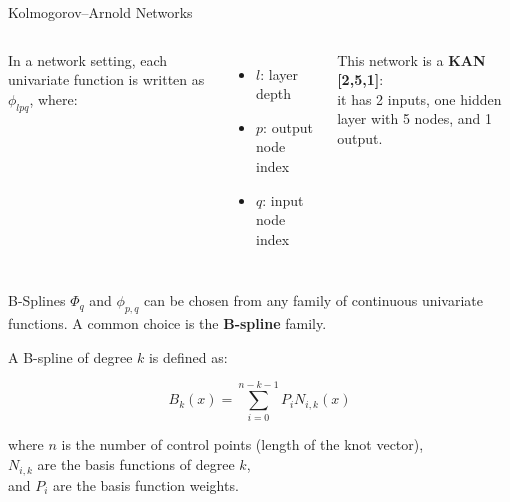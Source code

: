 \documentclass[aspectratio=169]{beamer}
\begin{document}
\begin{frame}{Kolmogorov–Arnold Networks}
	
	\begin{columns}[T,onlytextwidth]
		
		\centering
		\resizebox{\linewidth}{!}{}
		
		In a network setting, each univariate function is written as $\phi_{lpq}$, where:
		\vspace{0.8em}
		\begin{itemize}
			\item $l$: layer depth  
			\item $p$: output node index  
			\item $q$: input node index
		\end{itemize}
		
		\vspace{1em}
		This network is a \textbf{KAN [2,5,1]}:\\it has 2 inputs, one hidden layer with 5 nodes, and 1 output.
		
	\end{columns}
	
\end{frame}



\begin{frame}{B-Splines}
$\Phi_q$ and $\phi_{p,q}$ can be chosen from any family of continuous univariate functions. A common choice is the \textbf{B-spline} family.

A B-spline of degree $k$ is defined as:

$$B_k(x) = \sum_{i=0}^{n-k-1} P_i N_{i,k}(x)$$

where $n$ is the number of control points (length of the knot vector),\\
$N_{i,k}$ are the basis functions of degree $k$,\\
and $P_i$ are the basis function weights.
\end{frame}

\end{document}
